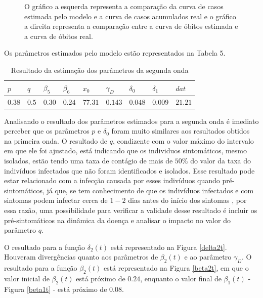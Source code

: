\documentclass[12pt]{article}
\begin{document}
\begin{figure}[h!]
    \centering
    
    
    \caption{O gráfico a esquerda representa a comparação da curva de casos estimada pelo modelo e a curva de casos acumulados real e o gráfico a direita representa a comparação entre a curva de óbitos estimada e a curva de óbitos real.}
    \label{fitting2onda}
\end{figure}

Os parâmetros estimados pelo modelo estão representados na Tabela 5.

\begin{table}[h!]
\label{resuparams2}
\centering
\begin{small}
\caption{Resultado da estimação dos parâmetros da segunda onda} 
\begin{tabular}{|p{1.5cm}|p{1.5cm}|p{1.5cm}|p{1.5cm}|p{1.5cm}|p{1.5cm}|p{1.5cm}|p{1.5cm}|p{1.5cm}|}
\hline
 $p$ & $q$ & $\beta_5$ & $\beta_6$ & $x_0$ & $\gamma_D$ & $\delta_0$ & $\delta_1$ & $dat$\\
\hline
 $0.38$& $0.5$& $0.30$ & $0.24$ & $77.31$ & $0.143$ & $0.048$ & $0.009$ & $21.21$ \\
\hline
\end{tabular}
\end{small}
\end{table}

Analisando o resultado dos parâmetros estimados para a segunda onda é imediato perceber que os parâmetros $p$ e $\delta_0$ foram muito similares aos resultados obtidos na primeira onda. O resultado de $q$, condizente com o valor máximo do intervalo em que ele foi ajustado, está indicando que os individuos sintomáticos, mesmo isolados, estão tendo uma taxa de contágio de mais de $50\%$ do valor da taxa do indivíduos infectados que não foram identificados e isolados. Esse resultado pode estar relacionado com a infecção causada por esses indivíduos quando pré-sintomáticos, já que, se tem conhecimento de que os indivíduos infectados e com sintomas podem infectar cerca de $1-2$ dias antes do início dos sintomas \cite{he2020temporal}, por essa razão, uma possibilidade para verificar a validade desse resultado é incluir os pré-sintomáticos na dinâmica da doença e analisar o impacto no valor do parâmetro $q$. 

O resultado para a função $\delta_2(t)$ está representado na Figura \ref{delta2t}. Houveram divergências quanto aos parâmetros de $\beta_2(t)$ e ao parâmetro $\gamma_D$. O resultado para a função $\beta_2(t)$ está representado na Figura \ref{beta2t}, em que o valor inicial de $\beta_2(t)$ está próximo de $0.24$, enquanto o valor final de $\beta_1(t)$ - Figura \ref{beta1t} - está próximo de $0.08$.
\end{document}
